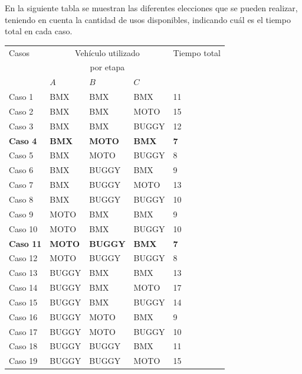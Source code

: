 \newpage

En la siguiente tabla se muestran las diferentes elecciones que se pueden realizar,
teniendo en cuenta la cantidad de usos disponibles, indicando cu\'al es el tiempo total en cada caso.\\

\begin{table}[htb]
\label{TABLITAetapas}
\centering
\begin{tabular}[c]{|l|l|l|l|l|}

		\hline
		Casos &\multicolumn{3}{|c|}{Veh\'iculo utilizado}& Tiempo total \\
		&\multicolumn{3}{|c|}{por etapa}&   \\
		\cline{2-4}
		&  $A$  &  $B$  &  $C$ &  \\
		\hline
		Caso 1& BMX & BMX & BMX & 11 \\
		\hline
		Caso 2& BMX & BMX & MOTO & 15 \\
		\hline
		Caso 3& BMX & BMX & BUGGY & 12 \\
		\hline
		\textbf{Caso 4}& \textbf{BMX} & \textbf{MOTO} & \textbf{BMX} & \textbf{7} \\
		\hline
		Caso 5& BMX & MOTO & BUGGY & 8 \\
		\hline		
		Caso 6& BMX & BUGGY & BMX & 9 \\
		\hline
		Caso 7& BMX & BUGGY & MOTO & 13 \\
		\hline
		Caso 8& BMX & BUGGY & BUGGY & 10 \\
		\hline
		Caso 9& MOTO & BMX & BMX & 9\\
		\hline
		Caso 10& MOTO & BMX & BUGGY & 10 \\
		\hline
		\textbf{Caso 11}& \textbf{MOTO} & \textbf{BUGGY} & \textbf{BMX} & \textbf{7} \\
		\hline
		Caso 12& MOTO & BUGGY & BUGGY & 8 \\
		\hline
		Caso 13& BUGGY & BMX & BMX & 13 \\
		\hline
		Caso 14& BUGGY & BMX & MOTO & 17 \\
		\hline
		Caso 15& BUGGY & BMX & BUGGY & 14 \\
		\hline
		Caso 16& BUGGY & MOTO & BMX & 9 \\
		\hline
		Caso 17& BUGGY & MOTO & BUGGY & 10 \\
		\hline
		Caso 18& BUGGY & BUGGY & BMX & 11 \\
		\hline
		Caso 19& BUGGY & BUGGY & MOTO & 15 \\
		\hline
		
	\end{tabular}
\end{table}

